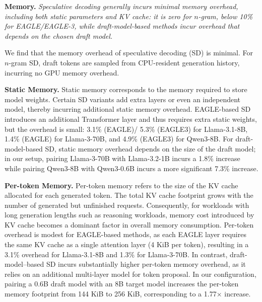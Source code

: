 \begin{quoting}[leftmargin=1.5em, rightmargin=1.5em, vskip=0pt]
\textbf{Memory.}
\emph{Speculative decoding generally incurs minimal memory overhead, including both static parameters and KV cache: it is zero for $n$-gram, below 10\% for EAGLE/EAGLE-3, while draft-model-based methods incur overhead that depends on the chosen draft model.}
\end{quoting}
We find that the memory overhead of speculative decoding (SD) is minimal. For $n$-gram SD, draft tokens are sampled from CPU-resident generation history, incurring no GPU memory overhead. 

\textbf{Static Memory.} Static memory corresponds to the memory required to store model weights. Certain SD variants add extra layers or even an independent model, thereby incurring additional static memory overhead. EAGLE-based SD introduces an additional Transformer layer and thus requires extra static weights, but the overhead is small: 3.1\% (EAGLE)/ 5.3\% (EAGLE3) for Llama-3.1-8B, 1.4\% (EAGLE) for Llama-3-70B, and 4.9\% (EAGLE3) for Qwen3-8B.
For draft-model-based SD, static memory overhead depends on the size of the draft model; in our setup, pairing Llama-3-70B with Llama-3.2-1B incurs a 1.8\% increase while pairing Qwen3-8B with Qwen3-0.6B incurs a more significant 7.3\% increase. 

\textbf{Per-token Memory.} Per-token memory refers to the size of the KV cache allocated for each generated token. The total KV cache footprint grows with the number of generated but unfinished requests. Consequently, for workloads with long generation lengths such as reasoning workloads, memory cost introduced by KV cache becomes a dominant factor in overall memory consumption.
Per-token overhead is modest for EAGLE-based methods, as each EAGLE layer requires the same KV cache as a single attention layer (4 KiB per token), resulting in a 3.1\% overhead for Llama-3.1-8B and 1.3\% for Llama-3-70B. 
In contrast, draft-model–based SD incurs substantially higher per-token memory overhead, as it relies on an additional multi-layer model for token proposal. In our configuration, pairing a 0.6B draft model with an 8B target model increases the per-token memory footprint from 144 KiB to 256 KiB, corresponding to a 1.77$\times$ increase.






